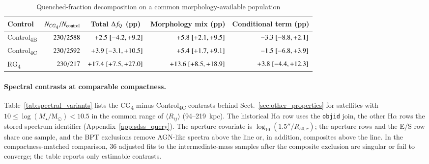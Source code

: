 \documentclass{aa}
\newcommand{\CB}{Control\textsubscript{4B}}
\newcommand{\CC}{Control\textsubscript{4C}}
\newcommand{\CG}{CG\textsubscript{4}}
\newcommand{\RG}{RG\textsubscript{4}}
\newcommand{\msun}{\mathrm{M}_\odot}
\newcommand{\Rmed}{\langle R_{ij}\rangle}
\begin{document}
\begin{appendix}
\begin{table}
\centering
\caption{Quenched-fraction decomposition on a common morphology-available population}
\label{tab:quenching_decomposition}
\begin{tabular}{lrrrr}
\hline\hline
Control & \multicolumn{1}{c}{\(N_{\CG}/N_{\rm control}\)} & \multicolumn{1}{c}{Total \(\Delta f_{\rm Q}\) (pp)} & \multicolumn{1}{c}{Morphology mix (pp)} & \multicolumn{1}{c}{Conditional term (pp)} \\
\hline
\CB{} & \(230/2588\) & \(+2.5\;[-4.2,+9.2]\) & \(+5.8\;[+2.1,+9.5]\) & \(-3.3\;[-8.8,+2.1]\) \\
\CC{} & \(230/2592\) & \(+3.9\;[-3.1,+10.5]\) & \(+5.4\;[+1.7,+9.1]\) & \(-1.5\;[-6.8,+3.9]\) \\
\RG{} & \(230/217\) & \(+17.4\;[+7.5,+27.0]\) & \(+13.6\;[+8.5,+18.9]\) & \(+3.8\;[-4.4,+12.3]\) \\
\hline
\end{tabular}
\end{table}




\paragraph{Spectral contrasts at comparable compactness.} Table~\ref{tab:spectral_variants} lists the \CG{}-minus-\CC{} contrasts behind Sect.~\ref{sec:other_properties} for satellites with \(10 \le \log(M_\star/\msun) < 10.5\) in the common range of \(\Rmed\) (94--219~kpc). The historical H\(\alpha\) row uses the \texttt{objid} join, the other H\(\alpha\) rows the stored spectrum identifier (Appendix~\ref{app:sdss_query}). The aperture covariate is \(\log_{10}(1.5''/R_{50,r})\); the aperture rows and the E/S row share one sample, and the BPT exclusions remove AGN-like spectra above the \citet{Kewley+01} line or, in addition, composites above the \citet{Kauffmann+03a} line. In the compactness-matched comparison, 36 adjusted fits to the intermediate-mass samples after the composite exclusion are singular or fail to converge; the table reports only estimable contrasts.


\end{appendix}
\end{document}

